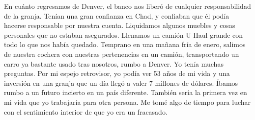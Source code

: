 \documentclass[twoside, 12pt]{book}
\begin{document}
En cuánto regresamos de Denver, el banco nos liberó de cualquier responsabilidad de la granja. Tenían una gran confianza en Chad, y confiaban que él podía hacerse responsable por nuestra cuenta. Liquidamos algunos muebles y cosas personales que no estaban asegurados. Llenamos un camión U-Haul grande con todo lo que nos había quedado. Temprano en una mañana fría de enero, salimos de nuestra cochera con nuestras pertenencias en un camión, transportando un carro ya bastante usado tras nosotros, rumbo a Denver. Yo tenía muchas preguntas. Por mi espejo retrovisor, yo podía ver 53 años de mi vida y una inversión en una granja que un día llegó a valer 7 millones de dólares. Íbamos rumbo a un futuro incierto en un país diferente. También sería la primera vez en mi vida que yo trabajaría para otra persona. Me tomé algo de tiempo para luchar con el sentimiento interior de que yo era un fracasado.\\
\end{document}
